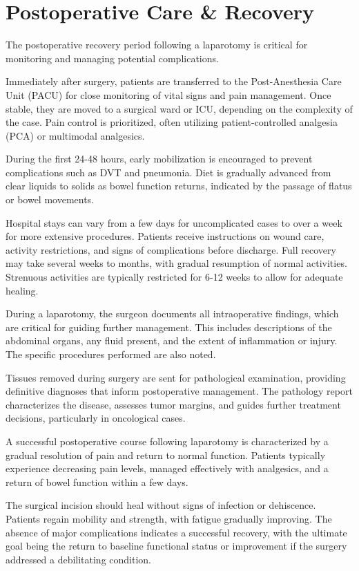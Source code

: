 \section*{Postoperative Care \& Recovery}
The postoperative recovery period following a laparotomy is critical for monitoring and managing potential complications. 

Immediately after surgery, patients are transferred to the Post-Anesthesia Care Unit (PACU) for close monitoring of vital signs and pain management. Once stable, they are moved to a surgical ward or ICU, depending on the complexity of the case. Pain control is prioritized, often utilizing patient-controlled analgesia (PCA) or multimodal analgesics.

During the first 24-48 hours, early mobilization is encouraged to prevent complications such as DVT and pneumonia. Diet is gradually advanced from clear liquids to solids as bowel function returns, indicated by the passage of flatus or bowel movements. 

Hospital stays can vary from a few days for uncomplicated cases to over a week for more extensive procedures. Patients receive instructions on wound care, activity restrictions, and signs of complications before discharge. Full recovery may take several weeks to months, with gradual resumption of normal activities. Strenuous activities are typically restricted for 6-12 weeks to allow for adequate healing.

During a laparotomy, the surgeon documents all intraoperative findings, which are critical for guiding further management. This includes descriptions of the abdominal organs, any fluid present, and the extent of inflammation or injury. The specific procedures performed are also noted.

Tissues removed during surgery are sent for pathological examination, providing definitive diagnoses that inform postoperative management. The pathology report characterizes the disease, assesses tumor margins, and guides further treatment decisions, particularly in oncological cases.

A successful postoperative course following laparotomy is characterized by a gradual resolution of pain and return to normal function. Patients typically experience decreasing pain levels, managed effectively with analgesics, and a return of bowel function within a few days.

The surgical incision should heal without signs of infection or dehiscence. Patients regain mobility and strength, with fatigue gradually improving. The absence of major complications indicates a successful recovery, with the ultimate goal being the return to baseline functional status or improvement if the surgery addressed a debilitating condition.

